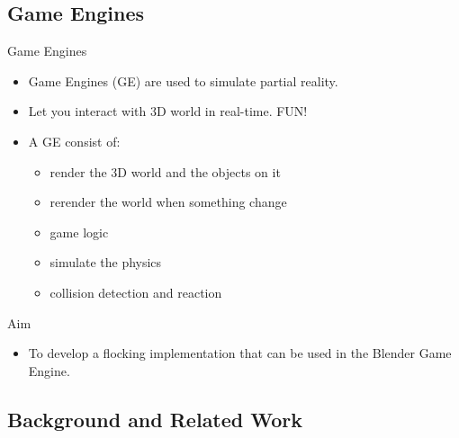\documentclass[red]{beamer}
\begin{document}
\subsection{Game Engines}
\begin{frame}{Game Engines}
	\begin{itemize}
		\pause \item Game Engines (GE) are used to simulate partial reality.
		\pause \item Let you interact with 3D world in real-time. \pause FUN!
		\pause \item A GE consist of:
			\begin{itemize}
				\pause \item render the 3D world and the objects on it
				\pause \item rerender the world when something change
				\pause \item game logic
				\pause \item simulate the physics
				\pause \item collision detection and reaction
			\end{itemize}
	\end{itemize}
\end{frame}

\begin{frame}{Aim}
	\begin{itemize}
		\pause \item To develop a flocking implementation that can be used in the Blender Game Engine.
	\end{itemize}
\end{frame}


\subsection{Background and Related Work}

\end{document}
